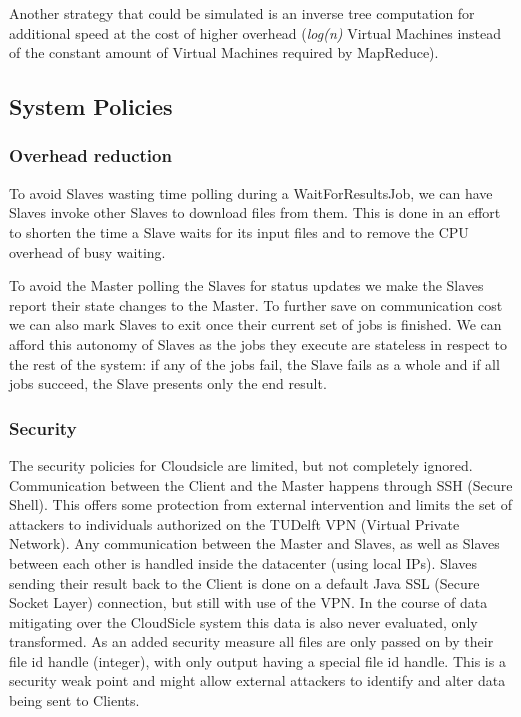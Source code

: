 \documentclass[twocolumn,twoside]{IEEEtran}
\begin{document}
Another strategy that could be simulated is an inverse
tree computation for additional speed at the cost of higher
overhead (\emph{log(n)} Virtual Machines instead of the constant
amount of Virtual Machines required by MapReduce). 

\subsection{System Policies}
\subsubsection{Overhead reduction}
To avoid Slaves wasting time polling during a WaitForResultsJob,
we can have Slaves invoke other Slaves to download files from them. 
This is done in an effort to shorten the time a Slave waits for its 
input files and to remove the CPU overhead of busy waiting.

To avoid the Master polling
the Slaves for status updates we make the Slaves
report their state changes to the Master. To further save on communication
cost we can also mark Slaves to exit once their current set of
jobs is finished. We can afford this autonomy of Slaves as the
jobs they execute are stateless in respect to the rest of the
system: if any of the jobs fail, the Slave fails as a whole and if
all jobs succeed, the Slave presents only the end result.

\subsubsection{Security}
The security policies for Cloudsicle are limited, but not completely
ignored. Communication between the Client and the Master
happens through SSH (Secure Shell). This offers some protection
from external intervention and limits the set of attackers to 
individuals authorized on the TUDelft VPN (Virtual Private Network). 
Any communication between the
Master and Slaves, as well as Slaves between each other is handled
inside the datacenter (using local IPs). 
Slaves sending their result back to the Client  
is done on a default Java SSL (Secure Socket Layer) connection,
but still with use of the VPN.
In the course of data mitigating over the CloudSicle system
this data is also never evaluated, only transformed.
As an added security measure all files are only passed on by
their file id handle (integer), with only output having a special
file id handle. This is a security weak point and might allow
external attackers to identify and alter data being sent to
Clients.
\end{document}

